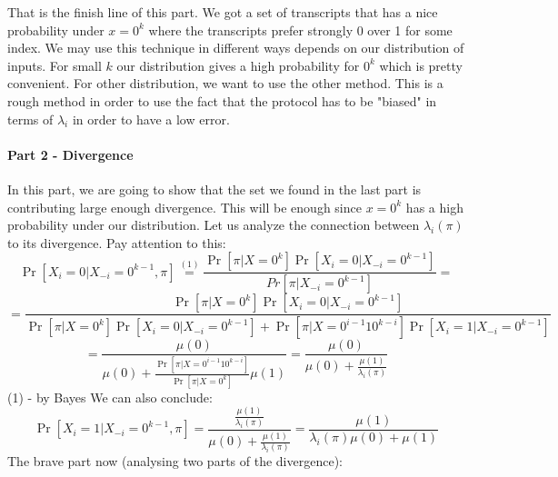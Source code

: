 \documentclass{article}
\theoremstyle{plain}
\begin{document}
That is the finish line of this part. We got a set of transcripts that has a nice probability under $x = 0^k$ where the transcripts prefer strongly 0 over 1 for some index. We may use this technique in different ways depends on our distribution of inputs. For small $k$ our distribution gives a high probability for $0^k$ which is pretty convenient. For other distribution, we want to use the other method. \newline
This is a rough method in order to use the fact that the protocol has to be "biased" in terms of $\lambda_i$ in order to have a low error. \newline
\paragraph{Part 2 - Divergence}
In this part, we are going to show that the set we found in the last part is contributing large enough divergence. This will be enough since $x = 0^k$ has a high probability under our distribution. \newline
Let us analyze the connection between $\lambda_i(\pi)$ to its divergence. \newline
Pay attention to this: \newline
\begin{equation*}
    \Pr[X_i = 0 | X_{-i}=0^{k-1}, \pi] \overset{(1)}{=} \frac{\Pr[\pi | X=0^k]\Pr[X_i=0|X_{-i}=0^{k-1}]}{Pr[\pi|X_{-i} = 0^{k-1}]} = 
\end{equation*}
\begin{equation*}
    = \frac{\Pr[\pi | X=0^k]\Pr[X_i=0|X_{-i}=0^{k-1}]}{\Pr[\pi | X=0^k]\Pr[X_i=0|X_{-i}=0^{k-1}] + \Pr[\pi | X=0^{i-1}10^{k-i}]\Pr[X_i=1|X_{-i}=0^{k-1}]}
\end{equation*}
\begin{equation*}
 =  \frac{\mu(0)}{\mu(0) + \frac{\Pr[\pi | X=0^{i-1}10^{k-i}]}{\Pr[\pi | X=0^k]}\mu(1)} = \frac{\mu(0)}{\mu(0) + \frac{\mu(1)}{\lambda_i(\pi)}} 
\end{equation*} 
(1) - by Bayes \newline
We can also conclude: \newline
\begin{equation*}
\Pr[X_i = 1 | X_{-i}=0^{k-1}, \pi]  = \frac{\frac{\mu(1)}{\lambda_i(\pi)}}{\mu(0) + \frac{\mu(1)}{\lambda_i(\pi)}} = \frac{\mu(1)}{\lambda_i(\pi)\mu(0) + \mu(1)}
\end{equation*}
The brave part now (analysing two parts of the divergence): \newline
\end{document}
